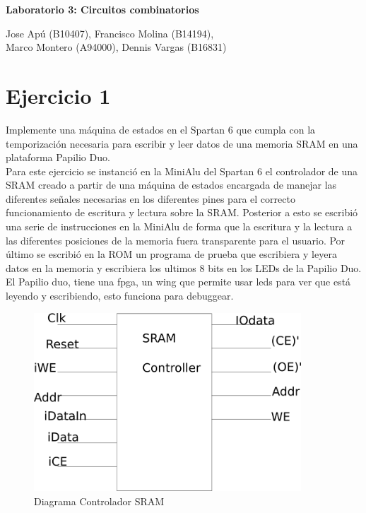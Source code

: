 \documentclass[10pt]{article}
\begin{document}
\begin{huge}
\begin{center}
\textbf{Laboratorio 3: Circuitos combinatorios}
\end{center}
\end{huge}

\begin{Large}
\begin{center}
Jose Apú (B10407), Francisco Molina (B14194), \\Marco Montero (A94000), Dennis Vargas (B16831)
\end{center}
\end{Large}


\section*{Ejercicio 1}
Implemente una máquina de estados en el Spartan 6 que cumpla con la temporización necesaria para escribir y leer datos de una memoria SRAM en una plataforma Papilio Duo.\\[0.3 cm]

Para este ejercicio se instanció en la MiniAlu del Spartan 6 el controlador de una SRAM creado a partir de una máquina de estados encargada de manejar las diferentes señales necesarias en los diferentes pines para el correcto funcionamiento de escritura y lectura sobre la SRAM. Posterior a esto se escribió una serie de instrucciones en la MiniAlu de forma que la escritura y la lectura a las diferentes posiciones de la memoria fuera transparente para el usuario. Por último se escribió en la ROM un programa de prueba que escribiera y leyera datos en la memoria y escribiera los ultimos 8 bits en los LEDs de la Papilio Duo. El Papilio duo, tiene una fpga, un wing que permite usar leds para ver que está leyendo y escribiendo, esto funciona para debuggear. \\



\begin{figure}[hbtp]
\centering
\includegraphics[width=10cm]{sramcontroller.png}
\caption{Diagrama Controlador SRAM}
\label{Con1}
\end{figure}
\end{document}
